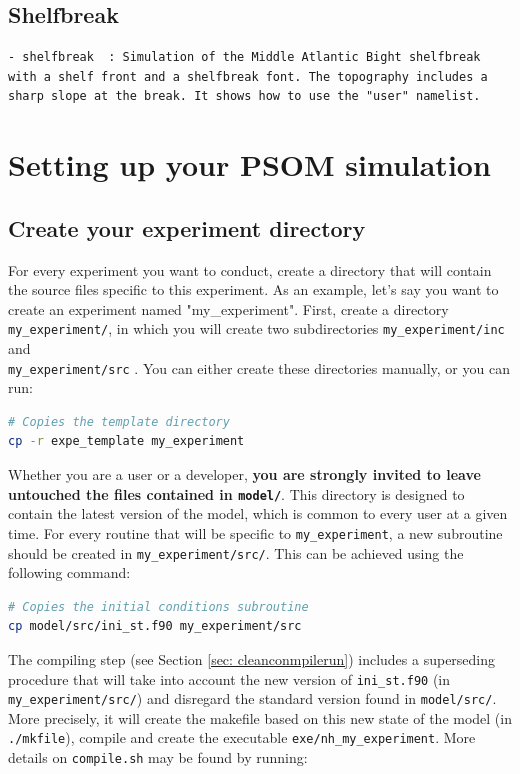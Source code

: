 \documentclass[12pt,letterpaper,titlepage]{article}
\begin{document}
\subsection{Shelfbreak}
\label{sec: Shelfbreak}
\begin{lstlisting}
- shelfbreak  : Simulation of the Middle Atlantic Bight shelfbreak with a shelf front and a shelfbreak font. The topography includes a sharp slope at the break. It shows how to use the "user" namelist. 
\end{lstlisting}

\section{Setting up your PSOM simulation}
\subsection{Create your experiment directory}

For every experiment you want to conduct, create a directory that will contain the source files specific to this experiment. As an example, let's say you want to create an experiment named "my\_experiment". First, create a directory \texttt{my\_experiment/}, in which you will create two subdirectories \texttt{my\_experiment/inc} and \\\texttt{my\_experiment/src} . You can either create these directories manually, or you can run:

\begin{lstlisting}[language=sh]
# Copies the template directory
cp -r expe_template my_experiment
\end{lstlisting}
Whether you are a user or a developer, \textbf{you are strongly invited to leave untouched the files contained in \texttt{model/}}. This directory is designed to contain the latest version of the model, which is common to every user at a given time. For every routine that will be specific to \texttt{my\_experiment}, a new subroutine should be created in \texttt{my\_experiment/src/}. This can be achieved using the following command:
\begin{lstlisting}[language=sh]
# Copies the initial conditions subroutine
cp model/src/ini_st.f90 my_experiment/src
\end{lstlisting}
The compiling step (see Section \ref{sec: cleanconmpilerun}) includes a superseding procedure that will take into account the new version of \texttt{ini\_st.f90} (in \texttt{my\_experiment/src/}) and disregard the standard version found in \texttt{model/src/}. More precisely, it will create the makefile based on this new state of the model (in \texttt{./mkfile}), compile and create the executable \texttt{exe/nh\_my\_experiment}. More details on \texttt{compile.sh} may be found by running:
\end{document}
